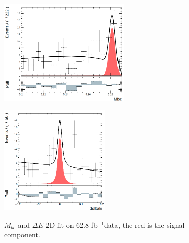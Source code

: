 \begin{figure}[htbp]
	\begin{minipage}[b]{0.5\linewidth}
		\centering 
		\includegraphics[height=5cm]{figures/mbc_data_new}
		\label{}
	\end{minipage}
	\begin{minipage}[b]{0.5\linewidth}
		\centering 
		\includegraphics[height=5.2cm]{figures/dE_data_new}
		\label{}
	\end{minipage}
\caption{$M_{bc}$ and $\Delta E$ 2D fit on 62.8 fb$^{-1}$data, the red is the signal component.}
\label{fig:2Ddata}
\end{figure}

